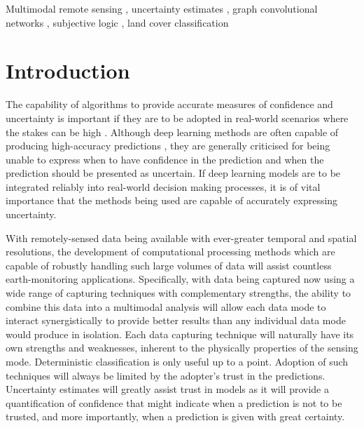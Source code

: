 \documentclass[
twocolumn,
]{ceurart}
\begin{document}
\begin{keywords}
  Multimodal remote sensing \sep
  uncertainty estimates \sep
  graph convolutional networks \sep
  subjective logic \sep
  land cover classification
\end{keywords}

\maketitle

\section{Introduction}
The capability of algorithms to provide accurate measures of confidence and uncertainty is important if they are to be adopted in real-world scenarios where the stakes can be high \cite{Goodman2017}.
Although deep learning methods are often capable of producing high-accuracy predictions \cite{LeCun2015, LiangpeiZhang2016}, they are generally criticised for being unable to express when to have confidence in the prediction and when the prediction should be presented as uncertain.
If deep learning models are to be integrated reliably into real-world decision making processes, it is of vital importance that the methods being used are capable of accurately expressing uncertainty.

With remotely-sensed data being available with ever-greater temporal and spatial resolutions, the development of computational processing methods which are capable of robustly handling such large volumes of data will assist countless earth-monitoring applications. 
Specifically, with data being captured now using a wide range of capturing techniques with complementary strengths, the ability to combine this data into a multimodal analysis will allow each data mode to interact synergistically to provide better results than any individual data mode would produce in isolation.
Each data capturing technique will naturally have its own strengths and weaknesses, inherent to the physically properties of the sensing mode.
Deterministic classification is only useful up to a point.
Adoption of such techniques will always be limited by the adopter's trust in the predictions.
Uncertainty estimates will greatly assist trust in models as it will provide a quantification of confidence that might indicate when a prediction is not to be trusted, and more importantly, when a prediction is given with great certainty.
\end{document}
